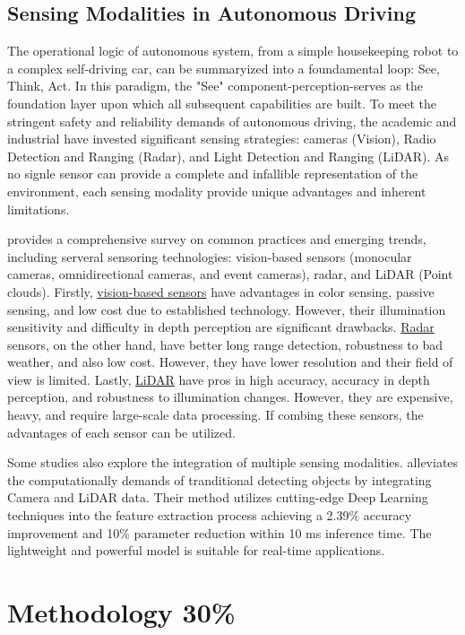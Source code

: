 \documentclass{article}
\begin{document}
\subsection{Sensing Modalities in Autonomous Driving}

The operational logic of autonomous system, from a simple housekeeping robot to a complex self-driving car, can be summaryized into a foundamental loop: See, Think, Act. In this paradigm, the "See" component-perception-serves as the foundation layer upon which all subsequent capabilities are built. To meet the stringent safety and reliability demands of autonomous driving, the academic and industrial have invested significant sensing strategies: cameras (Vision), Radio Detection and Ranging (Radar), and Light Detection and Ranging (LiDAR). As no signle sensor can provide a complete and infallible representation of the environment, each sensing modality provide unique advantages and inherent limitations.

\citet{yurtsever2020survey} provides a comprehensive survey on common practices and emerging trends, including serveral sensoring technologies: vision-based sensors (monocular cameras, omnidirectional cameras, and event cameras), radar, and LiDAR (Point clouds). Firstly, \underline{vision-based sensors} have advantages in color sensing, passive sensing, and low cost due to established technology. However, their illumination sensitivity and difficulty in depth perception are significant drawbacks. \underline{Radar} sensors, on the other hand, have better long range detection, robustness to bad weather, and also low cost. However, they have lower resolution and their field of view is limited. Lastly, \underline{LiDAR} have pros in high accuracy, accuracy in depth perception, and robustness to illumination changes. However, they are expensive, heavy, and require large-scale data processing. If combing these sensors, the advantages of each sensor can be utilized.

Some studies also explore the integration of multiple sensing modalities. \citet{pederiva2025light} alleviates the computationally demands of tranditional detecting objects by integrating Camera and LiDAR data. Their method utilizes cutting-edge Deep Learning techniques into the feature extraction process achieving a 2.39\% accuracy improvement and 10\% parameter reduction within 10 ms inference time. The lightweight and powerful model is suitable for real-time applications.

\section{Methodology 30\%}\label{sec:methodology}
\end{document}
